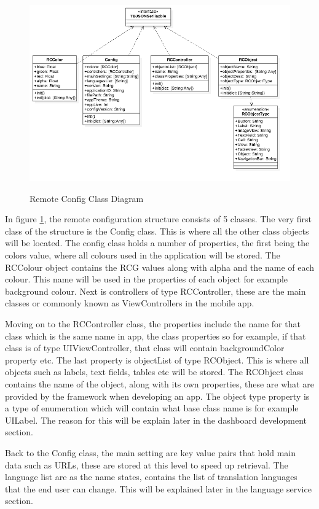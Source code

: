 \begin{figure}[!h]
    \caption{Remote Config Class Diagram}
    \centering
    \includegraphics[width=150mm]{images/classdiagrams/config}
    \label{fig:rc-cd}
\end{figure}

In figure \ref{fig:rc-cd}, the remote configuration structure consists of 5 classes. The very first class of the structure is the Config class. This is where all the other class objects will be located. The config class holds a number of properties, the first being the colors value, where all colours used in the application will be stored. The RCColour object contains the RCG values along with alpha and the name of each colour. This name will be used in the properties of each object for example background colour. Next is controllers of type RCController, these are the main classes or commonly known as ViewControllers in the mobile app. 

Moving on to the RCController class, the properties include the name for that class which is the same name in app, the class properties so for example, if that class is of type UIViewController, that class will contain backgroundColor property etc. The last property is objectList of type RCObject. This is where all objects such as labels, text fields, tables etc will be stored. The RCObject class contains the name of the object, along with its own properties, these are what are provided by the framework when developing an app. The object type property is a type of enumeration which will contain what base class name is for example UILabel. The reason for this will be explain later in the dashboard development section.

Back to the Config class, the main setting are key value pairs that hold main data such as URLs, these are stored at this level to speed up retrieval. The language list are as the name states, contains the list of translation languages that the end user can change. This will be explained later in the language service section.

